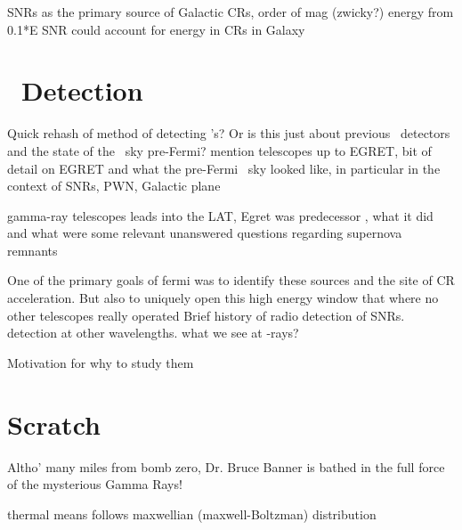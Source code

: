 SNRs as the primary source of Galactic CRs, order of mag (zwicky?) energy from 0.1*E SNR could account for energy in CRs in Galaxy

\section{\gam~Detection}\label{gamAstr:Detect}
Quick rehash of method of detecting \gam's? Or is this just about previous \gam ~detectors and the state of the \gam~sky pre-Fermi?  mention telescopes up to EGRET, bit of detail on EGRET and what the pre-Fermi \gam~sky looked like, in particular in the context of SNRs, PWN, Galactic plane

gamma-ray telescopes leads into the LAT, Egret was  predecessor , what it did and what were some relevant unanswered questions regarding supernova remnants 


One of the primary goals of fermi was to identify these sources and the site of CR acceleration. But also to uniquely open this high energy window that where no other telescopes really operated
Brief history of radio detection of SNRs. detection at other wavelengths. what we see at \g-rays?

Motivation for why to study them
\citep{Sturner95}
\citep{Esposito96}

\section{Scratch}

Altho' many miles from bomb zero, Dr. Bruce Banner is bathed in the full force of the mysterious Gamma Rays!

thermal means follows maxwellian (maxwell-Boltzman) distribution